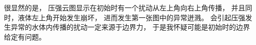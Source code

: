 \begin{frame}
    \frametitle{\subsecname}
    很显然的是，
    压强云图显示在初始时有一个扰动从左上角向右上角传播，
    并且同时，液体左上角开始发生崩坏，
    进而发生第一张图中的异常迸溅。
    会引起压强发生异常的水体内传播的扰动一定来源于边界力，
    于是我怀疑可能是初始时的边界给定有问题。
    \begin{figure}[H]
        \centering
    \end{figure}
\end{frame}

